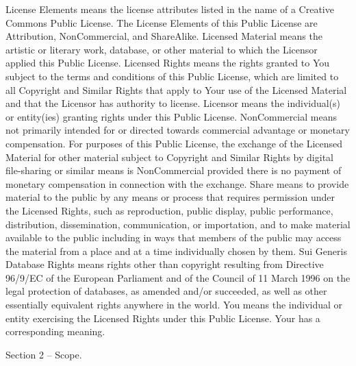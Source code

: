{    License Elements means the license attributes listed in the name of a Creative Commons Public License. The License Elements of this Public License are Attribution, NonCommercial, and ShareAlike.
    Licensed Material means the artistic or literary work, database, or other material to which the Licensor applied this Public License.
    Licensed Rights means the rights granted to You subject to the terms and conditions of this Public License, which are limited to all Copyright and Similar Rights that apply to Your use of the Licensed Material and that the Licensor has authority to license.
    Licensor means the individual(s) or entity(ies) granting rights under this Public License.
    NonCommercial means not primarily intended for or directed towards commercial advantage or monetary compensation. For purposes of this Public License, the exchange of the Licensed Material for other material subject to Copyright and Similar Rights by digital file-sharing or similar means is NonCommercial provided there is no payment of monetary compensation in connection with the exchange.
    Share means to provide material to the public by any means or process that requires permission under the Licensed Rights, such as reproduction, public display, public performance, distribution, dissemination, communication, or importation, and to make material available to the public including in ways that members of the public may access the material from a place and at a time individually chosen by them.
    Sui Generis Database Rights means rights other than copyright resulting from Directive 96/9/EC of the European Parliament and of the Council of 11 March 1996 on the legal protection of databases, as amended and/or succeeded, as well as other essentially equivalent rights anywhere in the world.
    You means the individual or entity exercising the Licensed Rights under this Public License. Your has a corresponding meaning.

Section 2 – Scope.

}
